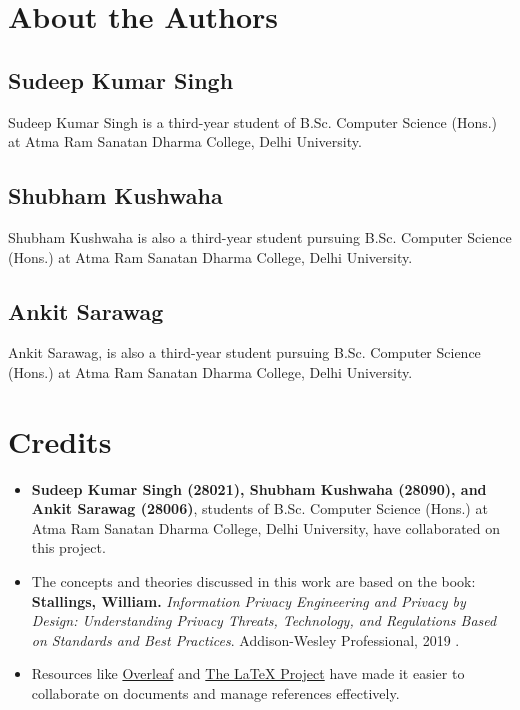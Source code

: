 \newpage
\section*{About the Authors}
\subsection*{Sudeep Kumar Singh}
Sudeep Kumar Singh is a third-year student of B.Sc. Computer Science (Hons.) at Atma Ram Sanatan Dharma College, Delhi University. 

\subsection*{Shubham Kushwaha}
Shubham Kushwaha is also a third-year student pursuing B.Sc. Computer Science (Hons.) at Atma Ram Sanatan Dharma College, Delhi University. 

\subsection*{Ankit Sarawag}
Ankit Sarawag, is also a third-year student pursuing B.Sc. Computer Science (Hons.) at Atma Ram Sanatan Dharma College, Delhi University. 

\newpage
\section*{Credits}
\begin{itemize}
    \item \textbf{Sudeep Kumar Singh (28021), Shubham Kushwaha (28090), and Ankit Sarawag (28006)}, students of B.Sc. Computer Science (Hons.) at Atma Ram Sanatan Dharma College, Delhi University, have collaborated on this project.
    
    \item The concepts and theories discussed in this work are based on the book:  
    \textbf{Stallings, William.} \textit{Information Privacy Engineering and Privacy by Design: Understanding Privacy Threats, Technology, and Regulations Based on Standards and Best Practices}. Addison-Wesley Professional, 2019 \cite{Stallings2019}.
    
    \item Resources like \href{https://www.overleaf.com}{Overleaf} and \href{https://www.latex-project.org}{The LaTeX Project} have made it easier to collaborate on documents and manage references effectively.
\end{itemize}



